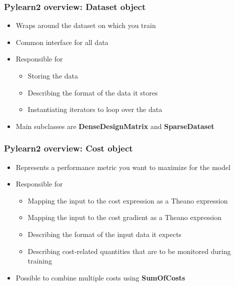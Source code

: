 \documentclass[mathserif, xcolor=dvipsnames]{beamer}
\begin{document}
\begin{frame}
    \frametitle{Pylearn2 overview: \textbf{Dataset} object}
    \Large
    \begin{itemize}\addtolength{\itemsep}{1.0\baselineskip}
        \item{Wraps around the dataset on which you train}
        \item{Common interface for all data}
        \item{
            Responsible for
            \begin{itemize}\addtolength{\itemsep}{0.5\baselineskip}
                \large
                \item{Storing the data}
                \item{Describing the format of the data it stores}
                \item{Instantiating iterators to loop over the data}
            \end{itemize}
        }
        \item{Main subclasses are \textbf{DenseDesignMatrix} and
              \textbf{SparseDataset}}
    \end{itemize}

\end{frame}

\begin{frame}
    \frametitle{Pylearn2 overview: \textbf{Cost} object}
    \Large
    \begin{itemize}\addtolength{\itemsep}{1.0\baselineskip}
        \item{Represents a performance metric you want to maximize for the model}
        \item{
            Responsible for
            \begin{itemize}
                \item{Mapping the input to the cost expression as a Theano
                      expression}
                \item{Mapping the input to the cost gradient as a Theano
                      expression}
                \item{Describing the format of the input data it expects}
                \item{Describing cost-related quantities that are to be
                      monitored during training}
            \end{itemize}
        }
        \item{Possible to combine multiple costs using \textbf{SumOfCosts}}
    \end{itemize}

\end{frame}
\end{document}
